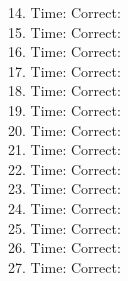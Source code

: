\documentclass[12pt, letterpaper]{article}
\begin{document}
\begin{multicols}{2}
{14. Time: \underline{\hspace{6em}}\quad Correct: \underline{\hspace{3em}}\\
15. Time: \underline{\hspace{6em}}\quad Correct: \underline{\hspace{3em}}\\
16. Time: \underline{\hspace{6em}}\quad Correct: \underline{\hspace{3em}}\\
17. Time: \underline{\hspace{6em}}\quad Correct: \underline{\hspace{3em}}\\
18. Time: \underline{\hspace{6em}}\quad Correct: \underline{\hspace{3em}}\\
19. Time: \underline{\hspace{6em}}\quad Correct: \underline{\hspace{3em}}\\
20. Time: \underline{\hspace{6em}}\quad Correct: \underline{\hspace{3em}}\\
21. Time: \underline{\hspace{6em}}\quad Correct: \underline{\hspace{3em}}\\
22. Time: \underline{\hspace{6em}}\quad Correct: \underline{\hspace{3em}}\\
23. Time: \underline{\hspace{6em}}\quad Correct: \underline{\hspace{3em}}\\
24. Time: \underline{\hspace{6em}}\quad Correct: \underline{\hspace{3em}}\\
25. Time: \underline{\hspace{6em}}\quad Correct: \underline{\hspace{3em}}\\
26. Time: \underline{\hspace{6em}}\quad Correct: \underline{\hspace{3em}}\\
27. Time: \underline{\hspace{6em}}\quad Correct: \underline{\hspace{3em}}\\
}
\end{multicols}
\end{document}
